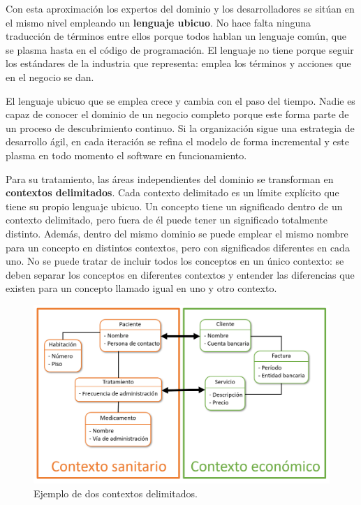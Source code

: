 \documentclass[11pt,spanish,listoffigures]{tfgetsinf}
\begin{document}
Con esta aproximación los expertos del dominio y los desarrolladores se sitúan en el mismo nivel empleando un \textbf{lenguaje ubicuo}. No hace falta ninguna traducción de términos entre ellos porque todos hablan un lenguaje común, que se plasma hasta en el código de programación. El lenguaje no tiene porque seguir los estándares de la industria que representa: emplea los términos y acciones que en el negocio se dan.

El lenguaje ubicuo que se emplea crece y cambia con el paso del tiempo. Nadie es capaz de conocer el dominio de un negocio completo porque este forma parte de un proceso de descubrimiento continuo. Si la organización sigue una estrategia de desarrollo ágil, en cada iteración se refina el modelo de forma incremental y este plasma en todo momento el software en funcionamiento.

Para su tratamiento, las áreas independientes del dominio se transforman en \textbf{contextos delimitados}. Cada contexto delimitado es un límite explícito que tiene su propio lenguaje ubicuo. Un concepto tiene un significado dentro de un contexto delimitado, pero fuera de él puede tener un significado totalmente distinto. Además, dentro del mismo dominio se puede emplear el mismo nombre para un concepto en distintos contextos, pero con significados diferentes en cada uno. No se puede tratar de incluir todos los conceptos en un único contexto: se deben separar los conceptos en diferentes contextos y entender las diferencias que existen para un concepto llamado igual en uno y otro contexto.

\begin{figure}[h]
\centering
\includegraphics[scale=0.6]{BoundedContexts}
\caption{Ejemplo de dos contextos delimitados.}
\label{fig:BoundedContexts}
\end{figure}
\end{document}
